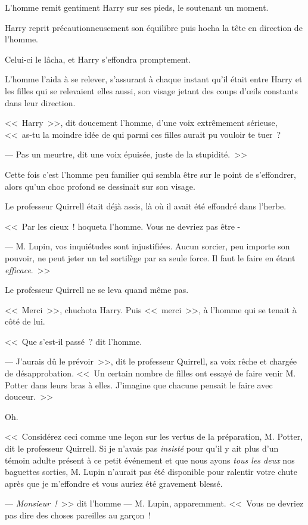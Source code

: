 L'homme remit gentiment Harry sur ses pieds, le soutenant un moment.

Harry reprit précautionneusement son équilibre puis hocha la tête en direction de l'homme.

Celui-ci le lâcha, et Harry s'effondra promptement.

L'homme l'aida à se relever, s'assurant à chaque instant qu'il était entre Harry et les filles qui se relevaient elles aussi, son visage jetant des coups d'œils constants dans leur direction.

<<~Harry~>>, dit doucement l'homme, d'une voix extrêmement sérieuse, <<~as-tu la moindre idée de qui parmi ces filles aurait pu vouloir te tuer~?

--- Pas un meurtre, dit une voix épuisée, juste de la stupidité.~>>

Cette fois c'est l'homme peu familier qui sembla être sur le point de s'effondrer, alors qu'un choc profond se dessinait sur son visage.

Le professeur Quirrell était déjà assis, là où il avait été effondré dans l'herbe.

<<~Par les cieux~! hoqueta l'homme. Vous ne devriez pas être -

--- M. Lupin, vos inquiétudes sont injustifiées. Aucun sorcier, peu importe son pouvoir, ne peut jeter un tel sortilège par sa seule force. Il faut le faire en étant \emph{efficace}.~>>

Le professeur Quirrell ne se leva quand même pas.

<<~Merci~>>, chuchota Harry. Puis <<~merci~>>, à l'homme qui se tenait à côté de lui.

<<~Que s'est-il passé~? dit l'homme.

--- J'aurais dû le prévoir~>>, dit le professeur Quirrell, sa voix rêche et chargée de désapprobation. <<~Un certain nombre de filles ont essayé de faire venir M. Potter dans leurs bras à elles. J'imagine que chacune pensait le faire avec douceur.~>>

Oh.

<<~Considérez ceci comme une leçon sur les vertus de la préparation, M. Potter, dit le professeur Quirrell. Si je n'avais pas \emph{insisté} pour qu'il y ait plus d'un témoin adulte présent à ce petit événement et que nous ayons \emph{tous les deux} nos baguettes sorties, M. Lupin n'aurait pas été disponible pour ralentir votre chute après que je m'effondre et vous auriez été gravement blessé.

--- \emph{Monsieur~!}~>> dit l'homme — M. Lupin, apparemment. <<~Vous ne devriez pas dire des choses pareilles au garçon~!

